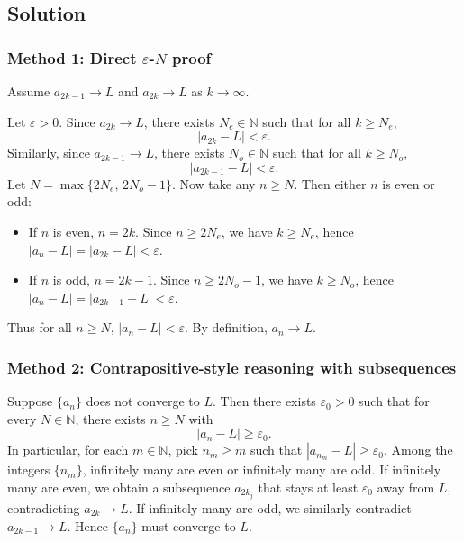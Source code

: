 \documentclass[12pt]{article}
\begin{document}
\subsection*{Solution}

\subsubsection*{Method 1: Direct \(\varepsilon\)-\(N\) proof}

Assume \(a_{2k-1}\to L\) and \(a_{2k}\to L\) as \(k\to\infty\).

Let \(\varepsilon>0\). Since \(a_{2k}\to L\), there exists \(N_e\in\mathbb{N}\) such that for all \(k\ge N_e\),
\[
|a_{2k}-L|<\varepsilon.
\]
Similarly, since \(a_{2k-1}\to L\), there exists \(N_o\in\mathbb{N}\) such that for all \(k\ge N_o\),
\[
|a_{2k-1}-L|<\varepsilon.
\]
Let \(N=\max\{2N_e,\,2N_o-1\}\). Now take any \(n\ge N\). Then either \(n\) is even or odd:

\begin{itemize}[leftmargin=*]
\item If \(n\) is even, \(n=2k\). Since \(n\ge 2N_e\), we have \(k\ge N_e\), hence \(|a_n-L|=|a_{2k}-L|<\varepsilon\).
\item If \(n\) is odd, \(n=2k-1\). Since \(n\ge 2N_o-1\), we have \(k\ge N_o\), hence \(|a_n-L|=|a_{2k-1}-L|<\varepsilon\).
\end{itemize}

Thus for all \(n\ge N\), \(|a_n-L|<\varepsilon\). By definition, \(\boxed{a_n\to L}\).

\subsubsection*{Method 2: Contrapositive-style reasoning with subsequences}

Suppose \(\{a_n\}\) does not converge to \(L\). Then there exists \(\varepsilon_0>0\) such that for every \(N\in\mathbb{N}\), there exists \(n\ge N\) with
\[
|a_n-L|\ge \varepsilon_0.
\]
In particular, for each \(m\in\mathbb{N}\), pick \(n_m\ge m\) such that \(|a_{n_m}-L|\ge \varepsilon_0\). Among the integers \(\{n_m\}\), infinitely many are even or infinitely many are odd. If infinitely many are even, we obtain a subsequence \(a_{2k_j}\) that stays at least \(\varepsilon_0\) away from \(L\), contradicting \(a_{2k}\to L\). If infinitely many are odd, we similarly contradict \(a_{2k-1}\to L\). Hence \(\{a_n\}\) must converge to \(L\).

\newpage
\end{document}

